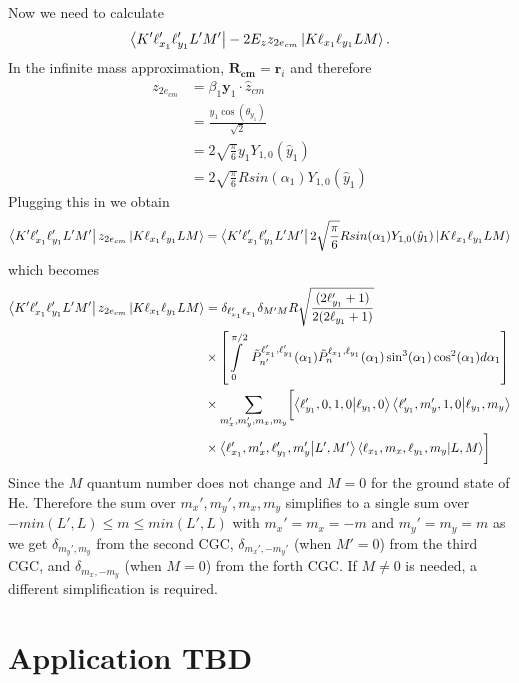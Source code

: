 Now we need to calculate 
\begin{equation}
    \bra{K'\ell_{x_1}'\ell_{y_1}'L'M'} -2E_z z_{2e_{cm}} \ket{K \ell_{x_1} \ell_{y_1}LM}.
\end{equation} 
In the infinite mass approximation, $\mathbf{R_{cm}}=\mathbf{r}_i$  and therefore 
\begin{align}
z_{2e_{cm}}&=\beta_1 \mathbf{y}_1\cdot\hat{z}_{cm} \\
&= \frac{y_1\cos(\theta_{y_1})}{\sqrt{2}}\\
&= 2 \sqrt{\frac{\pi}{6}}y_1Y_{1,0}(\hat{y}_1)\\
&= 2 \sqrt{\frac{\pi}{6}}Rsin(\alpha_1)Y_{1,0}(\hat{y}_1)
\end{align}
Plugging this in we obtain
\begin{equation}
    \bra{K'\ell_{x_1}'\ell_{y_1}'L'M'}  z_{2e_{cm}} \ket{K \ell_{x_1} \ell_{y_1}LM} = \bra{K'\ell_{x_1}'\ell_{y_1}'L'M'} 2\sqrt{\frac{\pi}{6}}Rsin(\alpha_1)Y_{1,0}(\hat{y}_1) \ket{K \ell_{x_1} \ell_{y_1}LM} 
\end{equation}
which becomes
\begin{align}
    \bra{K'\ell_{x_1}'\ell_{y_1}'L'M'} z_{2e_{cm}} \ket{K \ell_{x_1} \ell_{y_1}LM} &= \delta_{\ell_{x_1}'\ell_{x_1}} \delta_{M'M} R  \sqrt{\frac{(2\ell_{y_1}'+1)}{2(2\ell_{y_1}+1)}}\\
    & \times \left[\int\limits_0^{\pi/2}\ \tilde{P}^{\ell_{x_1}',\ell_{y_1}'}_{n'}(\alpha_1) \tilde{P}^{\ell_{x_1},\ell_{y_1}}_{n}(\alpha_1) \sin^3(\alpha_1) \cos^2(\alpha_1)d\alpha_1\right]\\
    & \times \sum\limits_{m_x',m_y',m_x,m_y} \biggl[\bra{\ell_{y_1}',0,1,0}\ket{\ell_{y_1},0} \bra{\ell_{y_1}',m_y',1,0}\ket{\ell_{y_1},m_y}\\
    & \times \bra{\ell_{x_1}',m_x',\ell_{y_1}',m_y'}\ket{L',M'} \bra{\ell_{x_1},m_x,\ell_{y_1},m_y}\ket{L,M}\biggr]
\end{align}
Since the $M$ quantum number does not change and $M=0$ for the ground state of He. Therefore the sum over $m_x',m_y',m_x,m_y$ simplifies to a single sum over $-min(L',L)\le m \le min(L',L)$ with $m_x'=m_x=-m$ and $m_y'=m_y=m$ as we get $\delta_{m_y',m_y}$ from the second CGC, $\delta_{m_x',-m_y'}$ (when $M'=0$) from the third CGC, and $\delta_{m_x,-m_y}$ (when $M=0$) from the forth CGC. If $M\ne0$ is needed, a different simplification is required.

\section{Application TBD} %
\label{sec:application_tbd}

